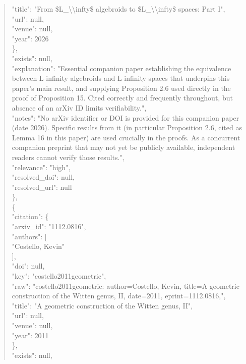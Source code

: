 \documentclass[11pt]{article}
\begin{document}
\begin{quote}
        "title": "From \$L\_\textbackslash{}\textbackslash{}infty\$ algebroids to \$L\_\textbackslash{}\textbackslash{}infty\$ spaces: Part I",\\
        "url": null,\\
        "venue": null,\\
        "year": 2026\\
      \},\\
      "exists": null,\\
      "explanation": "Essential companion paper establishing the equivalence between L-infinity algebroids and L-infinity spaces that underpins this paper's main result, and supplying Proposition 2.6 used directly in the proof of Proposition 15. Cited correctly and frequently throughout, but absence of an arXiv ID limits verifiability.",\\
      "notes": "No arXiv identifier or DOI is provided for this companion paper (date 2026). Specific results from it (in particular Proposition 2.6, cited as Lemma 16 in this paper) are used crucially in the proofs. As a concurrent companion preprint that may not yet be publicly available, independent readers cannot verify those results.",\\
      "relevance": "high",\\
      "resolved\_doi": null,\\
      "resolved\_url": null\\
    \},\\
    \{\\
      "citation": \{\\
        "arxiv\_id": "1112.0816",\\
        "authors": [\\
          "Costello, Kevin"\\
        ],\\
        "doi": null,\\
        "key": "costello2011geometric",\\
        "raw": "costello2011geometric: author=Costello, Kevin, title=A geometric construction of the Witten genus, II, date=2011, eprint=1112.0816,",\\
        "title": "A geometric construction of the Witten genus, II",\\
        "url": null,\\
        "venue": null,\\
        "year": 2011\\
      \},\\
      "exists": null,\\

\end{quote}
\end{document}

